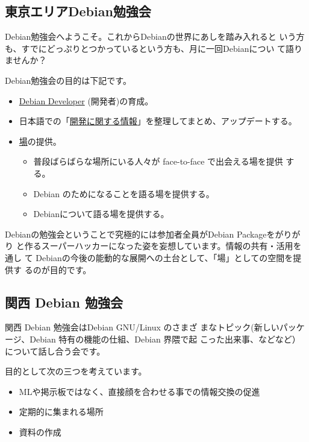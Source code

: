 \documentclass[mingoth,a4paper]{jsarticle}
\begin{document}

\subsection{東京エリアDebian勉強会}

 Debian勉強会へようこそ。これからDebianの世界にあしを踏み入れると
 いう方も、すでにどっぷりとつかっているという方も、月に一回Debianについ
 て語りませんか？

 Debian勉強会の目的は下記です。

\begin{itemize}
 \item \underline{Debian Developer} (開発者)の育成。
 \item 日本語での「\underline{開発に関する情報}」を整理してまとめ、アップデートする。
 \item \underline{場}の提供。
 \begin{itemize}
  \item 普段ばらばらな場所にいる人々が face-to-face で出会える場を提供
	する。
  \item Debian のためになることを語る場を提供する。
  \item Debianについて語る場を提供する。
 \end{itemize}
\end{itemize}

 Debianの勉強会ということで究極的には参加者全員がDebian Packageをがりがり
 と作るスーパーハッカーになった姿を妄想しています。情報の共有・活用を通し
 て Debianの今後の能動的な展開への土台として、「場」としての空間を提供す
 るのが目的です。

\subsection{関西 Debian 勉強会}

 関西 Debian 勉強会はDebian GNU/Linux のさまざ
 まなトピック(新しいパッケージ、Debian 特有の機能の仕組、Debian 界隈で起
 こった出来事、などなど）について話し合う会です。

 目的として次の三つを考えています。
 \begin{itemize}
  \item MLや掲示板ではなく、直接顔を合わせる事での情報交換の促進
  \item 定期的に集まれる場所
  \item 資料の作成
 \end{itemize}
\end{document}
